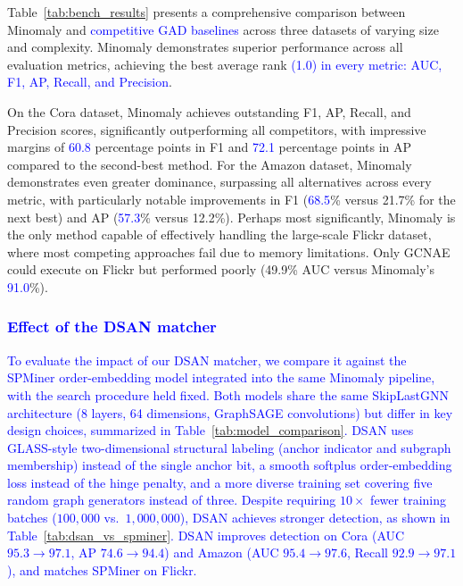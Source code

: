 \documentclass[preprint,12pt]{elsarticle}
\newcommand{\new}[1]{\textcolor{blue}{#1}}
\theoremstyle{plain}
\theoremstyle{definition}
\theoremstyle{remark}
\begin{document}

Table~\ref{tab:bench_results} presents a comprehensive comparison between Minomaly and \new{competitive GAD baselines} across three datasets of varying size and complexity. Minomaly demonstrates superior performance across all evaluation metrics, achieving the best average rank \new{(1.0) in every metric: AUC, F1, AP, Recall, and Precision}.

On the Cora dataset, Minomaly achieves outstanding F1, AP, Recall, and Precision scores, significantly outperforming all competitors, with impressive margins of \new{60.8} percentage points in F1 and \new{72.1} percentage points in AP compared to the second-best method. For the Amazon dataset, Minomaly demonstrates even greater dominance, surpassing all alternatives across every metric, with particularly notable improvements in F1 (\new{68.5}\% versus 21.7\% for the next best) and AP (\new{57.3}\% versus 12.2\%). Perhaps most significantly, Minomaly is the only method capable of effectively handling the large-scale Flickr dataset, where most competing approaches fail due to memory limitations. Only GCNAE could execute on Flickr but performed poorly (49.9\% AUC versus Minomaly's \new{91.0}\%).



\subsubsection{\new{Effect of the DSAN matcher}}
\label{sec:dsan_ablation}
\new{To evaluate the impact of our DSAN matcher, we compare it against the SPMiner order-embedding model \cite{ying2024representation} integrated into the same Minomaly pipeline, with the search procedure held fixed. Both models share the same SkipLastGNN architecture (8 layers, 64 dimensions, GraphSAGE convolutions) but differ in key design choices, summarized in Table~\ref{tab:model_comparison}. DSAN uses GLASS-style two-dimensional structural labeling (anchor indicator and subgraph membership) instead of the single anchor bit, a smooth softplus order-embedding loss instead of the hinge penalty, and a more diverse training set covering five random graph generators instead of three. Despite requiring $10\times$ fewer training batches ($100{,}000$ vs.\ $1{,}000{,}000$), DSAN achieves stronger detection, as shown in Table~\ref{tab:dsan_vs_spminer}. DSAN improves detection on Cora (AUC $95.3 \rightarrow 97.1$, AP $74.6 \rightarrow 94.4$) and Amazon (AUC $95.4 \rightarrow 97.6$, Recall $92.9 \rightarrow 97.1$), and matches SPMiner on Flickr.}
\end{document}
